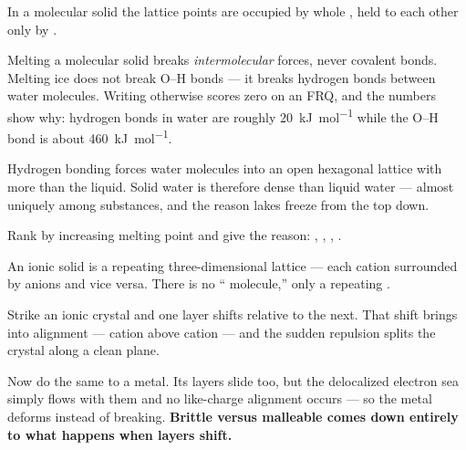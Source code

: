 \documentclass{apchem-notes}
\begin{document}


In a molecular solid the lattice points are occupied by whole
, held to each other only by
.

\begin{apctrap}
Melting a molecular solid breaks \emph{intermolecular} forces, never
covalent bonds. Melting ice does not break O--H bonds --- it breaks hydrogen
bonds between water molecules. Writing otherwise scores zero on an FRQ, and
the numbers show why: hydrogen bonds in water are roughly
\SI{20}{\kilo\joule\per\mole} while the O--H bond is about
\SI{460}{\kilo\joule\per\mole}.
\end{apctrap}


Hydrogen bonding forces water molecules into an open hexagonal lattice with
more  than the liquid. Solid water is
therefore  dense than liquid water --- almost
uniquely among substances, and the reason lakes freeze from the top down.


Rank by increasing melting point and give the reason:
, , , .



An ionic solid is a repeating three-dimensional lattice --- each cation
surrounded by anions and vice versa. There is no `` molecule,'' only
a repeating .

\begin{workedexample}
Strike an ionic crystal and one layer shifts relative to the next. That
shift brings  into alignment --- cation
above cation --- and the sudden repulsion splits the crystal along a clean
plane.

Now do the same to a metal. Its layers slide too, but the delocalized
electron sea simply flows with them and no like-charge alignment occurs ---
so the metal deforms instead of breaking. \textbf{Brittle versus malleable
comes down entirely to what happens when layers shift.}
\end{workedexample}
\end{document}

